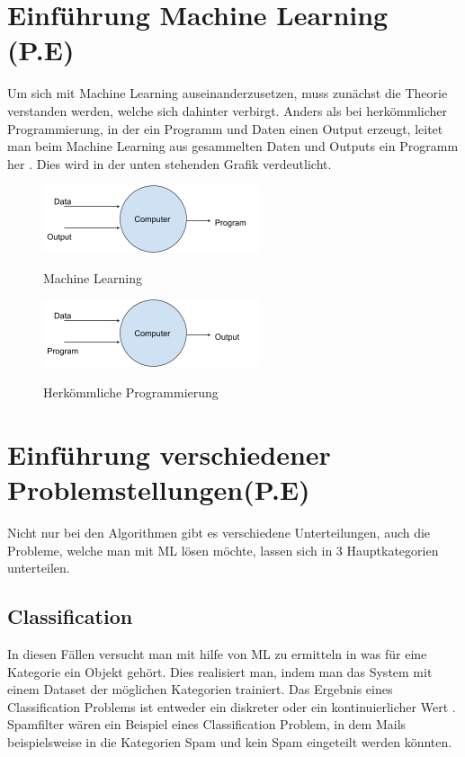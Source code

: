 \chapter{Einführung Machine Learning (P.E)}
\label{chap:einführungMachineLearning}
Um sich mit Machine Learning auseinanderzusetzen, muss zunächst die Theorie verstanden werden, welche sich dahinter verbirgt. Anders als bei herkömmlicher Programmierung, in der ein Programm und Daten einen Output erzeugt, leitet man beim Machine Learning aus gesammelten Daten und Outputs ein Programm her \cite[S.~3]{WML}.  Dies wird in der unten stehenden Grafik verdeutlicht.
\newline

\begin{figure}
	\includegraphics[]{../Bilder/sBdyby6FyPckxbimKufRD4Q.png}
	\caption{Machine Learning}\cite[S.~3]{WML}
\end{figure}
\begin{figure}
	\includegraphics[]{../Bilder/sZFI1L7gymY3C_ipjtqSvrg.png}
	\caption{Herkömmliche Programmierung}\cite[S.~3]{WML}
\end{figure}


\chapter{Einführung verschiedener Problemstellungen(P.E)}
\label{chap:einführungProblemstellungen}
Nicht nur bei den Algorithmen gibt es verschiedene Unterteilungen, auch die Probleme, welche man mit \ac{ML} lösen möchte, lassen sich in 3 Hauptkategorien unterteilen.

\section{Classification}
\label{sec:classification}
In diesen Fällen versucht man mit hilfe von \ac{ML} zu ermitteln in was für eine Kategorie ein Objekt gehört\cite{SKL}. Dies realisiert man, indem man das System mit einem Dataset der möglichen Kategorien trainiert. Das Ergebnis eines Classification Problems ist entweder ein diskreter oder ein kontinuierlicher Wert \cite[S.~4]{WML}. Spamfilter wären ein Beispiel eines Classification Problem, in dem Mails beispielsweise in die Kategorien Spam und kein Spam eingeteilt werden könnten. 

